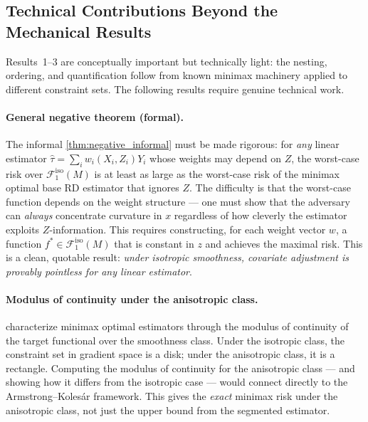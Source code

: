 \subsection{Technical Contributions Beyond the Mechanical Results}\label{sec:overview:technical}

Results~1--3 are conceptually important but technically light: the nesting, ordering, and quantification follow from known minimax machinery applied to different constraint sets.
The following results require genuine technical work.

\paragraph{General negative theorem (formal).}
The informal \cref{thm:negative_informal} must be made rigorous: for \emph{any} linear estimator $\hat\tau = \sum_i w_i(X_i, Z_i) Y_i$ whose weights may depend on $Z$, the worst-case risk over $\mathcal{F}_1^{\mathrm{iso}}(M)$ is at least as large as the worst-case risk of the minimax optimal base RD estimator that ignores $Z$.
The difficulty is that the worst-case function depends on the weight structure --- one must show that the adversary can \emph{always} concentrate curvature in $x$ regardless of how cleverly the estimator exploits $Z$-information.
This requires constructing, for each weight vector $w$, a function $f^* \in \mathcal{F}_1^{\mathrm{iso}}(M)$ that is constant in $z$ and achieves the maximal risk.
This is a clean, quotable result: \emph{under isotropic smoothness, covariate adjustment is provably pointless for any linear estimator}.

\paragraph{Modulus of continuity under the anisotropic class.}
\textcite{armstrong_simple_2020} characterize minimax optimal estimators through the modulus of continuity of the target functional over the smoothness class.
Under the isotropic class, the constraint set in gradient space is a disk; under the anisotropic class, it is a rectangle.
Computing the modulus of continuity for the anisotropic class --- and showing how it differs from the isotropic case --- would connect directly to the Armstrong--Kolesár framework.
This gives the \emph{exact} minimax risk under the anisotropic class, not just the upper bound from the segmented estimator.

